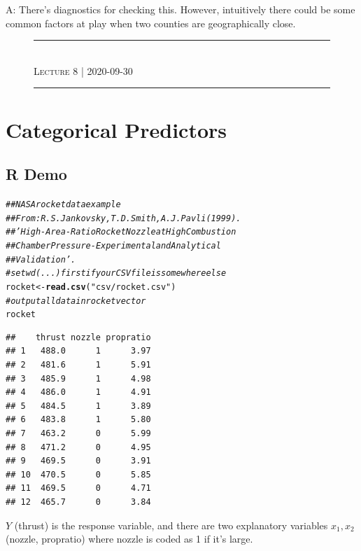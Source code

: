 \documentclass[oneside]{book}\usepackage[]{graphicx}\usepackage[dvipsnames,table,xcdraw]{xcolor}
\makeatletter
\newcommand{\hlstr}[1]{\textcolor[rgb]{0.192,0.494,0.8}{#1}}%
\newcommand{\hlcom}[1]{\textcolor[rgb]{0.678,0.584,0.686}{\textit{#1}}}%
\newcommand{\hlstd}[1]{\textcolor[rgb]{0.345,0.345,0.345}{#1}}%
\newcommand{\hlkwb}[1]{\textcolor[rgb]{0.69,0.353,0.396}{#1}}%
\newcommand{\hlkwd}[1]{\textcolor[rgb]{0.737,0.353,0.396}{\textbf{#1}}}%
\newenvironment{kframe}{%
 \def\at@end@of@kframe{}%
 \ifinner\ifhmode%
  \def\at@end@of@kframe{\end{minipage}}%
  \begin{minipage}{\columnwidth}%
 \fi\fi%
 \def\FrameCommand##1{\hskip\@totalleftmargin \hskip-\fboxsep
 \colorbox{shadecolor}{##1}\hskip-\fboxsep
     \hskip-\linewidth \hskip-\@totalleftmargin \hskip\columnwidth}%
 \MakeFramed {\advance\hsize-\width
   \@totalleftmargin\z@ \linewidth\hsize
   \@setminipage}}%
 {\par\unskip\endMakeFramed%
 \at@end@of@kframe}
\newenvironment{knitrout}{}{} %
\newcommand{\makeheading}[1]
{
    \begin{figure}[H]
        \centering
        \rule{\columnwidth}{1pt}\\
        {\large \scshape{#1}}\\[-0.6\baselineskip]
        \rule{\columnwidth}{1pt}
        \vspace*{-20pt}
    \end{figure}
}
\makeatother
\begin{document}
A: There's diagnostics for checking this. However,
intuitively there could be some common factors
at play when two counties are geographically close.




\makeheading{Lecture 8 | 2020-09-30}
\section{Categorical Predictors}
\subsection{R Demo}
\begin{knitrout}
\color{fgcolor}\begin{kframe}
\begin{alltt}
\hlcom{## NASA rocket data example}
\hlcom{## From: R.S. Jankovsky, T.D. Smith, A.J. Pavli (1999).}
\hlcom{## 'High-Area-Ratio Rocket Nozzle at High Combustion}
\hlcom{## Chamber Pressure-Experimental and Analytical}
\hlcom{## Validation'.}
\hlcom{# setwd(...) first if your CSV file is somewhere else}
\hlstd{rocket} \hlkwb{<-} \hlkwd{read.csv}\hlstd{(}\hlstr{"csv/rocket.csv"}\hlstd{)}
\hlcom{# output all data in rocket vector}
\hlstd{rocket}
\end{alltt}
\begin{verbatim}
##    thrust nozzle propratio
## 1   488.0      1      3.97
## 2   481.6      1      5.91
## 3   485.9      1      4.98
## 4   486.0      1      4.91
## 5   484.5      1      3.89
## 6   483.8      1      5.80
## 7   463.2      0      5.99
## 8   471.2      0      4.95
## 9   469.5      0      3.91
## 10  470.5      0      5.85
## 11  469.5      0      4.71
## 12  465.7      0      3.84
\end{verbatim}
\end{kframe}
\end{knitrout}

$Y$ (thrust) is the response variable, and there
are two explanatory variables $x_1,x_2$
(nozzle, propratio) where nozzle is coded
as 1 if it's large.
\end{document}
